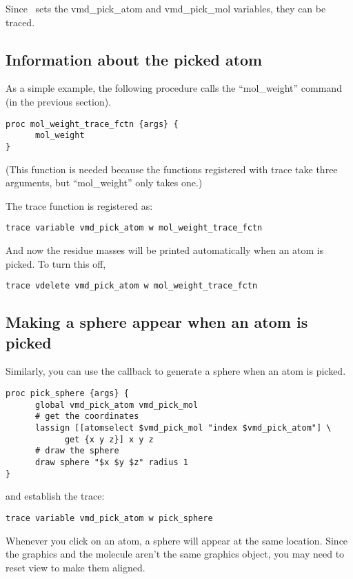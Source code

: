 Since \VMD\ sets the vmd\_pick\_atom and vmd\_pick\_mol variables, they
can be traced.  

\subsection {Information about the picked atom}

As a simple example, the following procedure calls the
``mol\_weight'' command (in the previous section).

\begin{verbatim}
proc mol_weight_trace_fctn {args} {
      mol_weight
}
\end{verbatim}
(This function is needed because the functions registered with
trace take three arguments, but ``mol\_weight'' only takes one.)

The trace function is registered as:
\begin{verbatim}
trace variable vmd_pick_atom w mol_weight_trace_fctn
\end{verbatim}
And now the residue masses will be printed automatically
when an atom is picked.  To turn this off,
\begin{verbatim}
trace vdelete vmd_pick_atom w mol_weight_trace_fctn
\end{verbatim}

\subsection {Making a sphere appear when an atom is picked}


Similarly, you can use the callback to generate a sphere
when an atom is picked.

\begin{verbatim}
proc pick_sphere {args} {
      global vmd_pick_atom vmd_pick_mol
      # get the coordinates
      lassign [[atomselect $vmd_pick_mol "index $vmd_pick_atom"] \
            get {x y z}] x y z
      # draw the sphere
      draw sphere "$x $y $z" radius 1
}
\end{verbatim}
and establish the trace:

\begin{verbatim}
trace variable vmd_pick_atom w pick_sphere
\end{verbatim}

Whenever you click on an atom, a sphere will appear at the same
location.  Since the graphics and the molecule aren't the same
graphics object, you may need to reset view to make them aligned.

